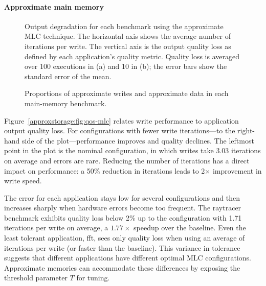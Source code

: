 \paragraph{Approximate main memory}

\begin{figure}
    \centering
    \caption{
        Output degradation for each benchmark using the approximate
        MLC technique.
        The horizontal
        axis shows the average number of iterations per write.
        The vertical axis is the output quality loss as
        defined by each application's quality metric.
        Quality loss is averaged over 100 executions in (a) and 10 in (b); the
        error bars show the standard error of the mean.
    }
\end{figure}

\begin{figure}
    \centering
    
    \caption{
        Proportions of approximate writes and approximate data in
        each main-memory benchmark.
    }
    \label{approxstorage:fig:approxstats}
\end{figure}

Figure~\ref{approxstorage:fig:qos-mlc} relates write performance to application output
quality loss.
For configurations with fewer write iterations---to the
right-hand side of the plot---performance improves and quality declines. The
leftmost point in the plot is the nominal configuration, in which writes take
3.03 iterations on average and errors are rare. Reducing the number
of iterations has a direct impact on performance: a 50\% reduction in
iterations leads to 2$\times$ improvement in write speed.

The error for each application stays low for several configurations and then
increases sharply when hardware errors become too frequent.
The \textsf{raytracer} benchmark exhibits quality loss below 2\% up to the
configuration with 1.71 iterations per write on average, a $1.77\times$ speedup over the
baseline. Even the least tolerant application, \textsf{fft}, sees only
quality loss when using an average of  iterations per write (or
 faster than the baseline).
This variance in tolerance suggests that
different applications have different optimal MLC configurations. Approximate
memories can accommodate these differences by exposing the threshold parameter $T$
for tuning.

